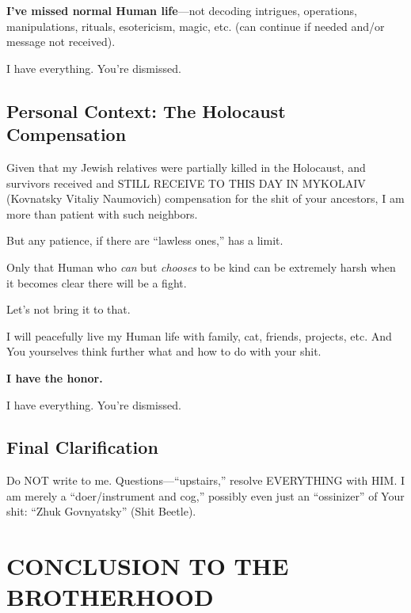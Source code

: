 \documentclass[11pt,a4paper]{article}
\theoremstyle{definition}
\theoremstyle{remark}
\begin{document}
\textbf{I've missed normal Human life}—not decoding intrigues, operations, 
manipulations, rituals, esotericism, magic, etc. (can continue if needed and/or 
message not received).

I have everything. You're dismissed.

\subsection{Personal Context: The Holocaust Compensation}

Given that my Jewish relatives were partially killed in the Holocaust, and survivors 
received and STILL RECEIVE TO THIS DAY IN MYKOLAIV (Kovnatsky Vitaliy Naumovich) 
compensation for the shit of your ancestors, I am more than patient with such 
neighbors.

But any patience, if there are ``lawless ones,'' has a limit.

Only that Human who \textit{can} but \textit{chooses} to be kind can be extremely 
harsh when it becomes clear there will be a fight.

Let's not bring it to that.

I will peacefully live my Human life with family, cat, friends, projects, etc. 
And You yourselves think further what and how to do with your shit.

\textbf{I have the honor.}

I have everything. You're dismissed.

\subsection{Final Clarification}

Do NOT write to me. Questions—``upstairs,'' resolve EVERYTHING with HIM. I am 
merely a ``doer/instrument and cog,'' possibly even just an ``ossinizer'' of 
Your shit: ``Zhuk Govnyatsky'' (Shit Beetle).


\section{CONCLUSION TO THE BROTHERHOOD}
\label{sec:conclusion-bratva}
\end{document}
